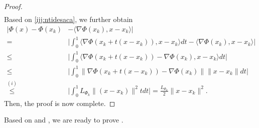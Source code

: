 \documentclass{osudissert96}
\begin{document}
\begin{proof}
\begin{align}
\end{align}
Based on \cref{ijj:ntidesaca}, we further obtain
\begin{align*}
|\Phi(x)-\Phi(x_k)&-\langle \nabla \Phi(x_k),x-x_k\rangle| 
\\=& \Big|\int_0^1 \langle \nabla\Phi(x_k+t(x-x_k)),x-x_k \rangle d t-\langle \nabla \Phi(x_k),x-x_k\rangle\Big| \nonumber
\\\leq& \Big| \int_0^1 \langle \nabla\Phi(x_k+t(x-x_k))-\nabla \Phi(x_k),x-x_k \rangle d t \Big| \nonumber
\\\leq & \Big| \int_0^1 \| \nabla\Phi(x_k+t(x-x_k))-\nabla \Phi(x_k)\| \|x-x_k\| d t \Big| \nonumber
\\\overset{(i)}\leq &\Big| \int_0^1 L_{\Phi_k}\|(x-x_k)\|^2 td t \Big| = \frac{L_{\Phi_k}}{2}\|x-x_k\|^2.
\end{align*}
Then, the proof is now complete. 
\end{proof}
Based on  and , we are ready to prove . 
\end{document}
